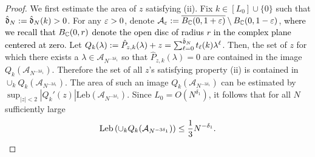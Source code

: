 \documentclass{amsart}
\numberwithin{equation}{section}
\def\corEE{\textcolor{amethyst}}
\def\corEE{}
\def\corABrev{\textcolor{black}}
\begin{document}
\begin{proof}
\corEE{We first estimate the area of $z$ satisfying (ii).}
Fix $k \in [L_0]\cup\{0\}$ such that $\hat {\mathfrak{d}}_N:=\hat{\mathfrak{d}}_N(k) >0$. For any $\varepsilon>0$, denote $\mathcal{A}_\varepsilon:= \overline{B_{\mathbb{C}}(0,1+\varepsilon)}\setminus B_{\mathbb{C}}(0,1-\varepsilon)$, \corABrev{where we recall that $B_{\mathbb{C}}(0,r)$ denote the open disc of radius $r$ in the complex plane centered at zero}. Let
\corEE{$Q_k(\lambda):= \hat{P}_{z,k}(\lambda) + z = \sum_{\ell=0}^{\hat{\mathfrak{d}}_N} t_\ell(k)\lambda^\ell$.  Then, the set of $z$ for which there exists a $\lambda \in \mathcal{A}_{N^{-3 \delta_1}}$ so that $\hat{P}_{z,k}(\lambda) = 0$ are contained in the image $Q_k(\mathcal{A}_{N^{-3 \delta_1}}).$}
Therefore the set of all $z$'s satisfying property (ii) is contained in $\cup_k Q_k(\mathcal{A}_{N^{-3 \delta_1}})$.
\corEE{The area of such an image $Q_k(\mathcal{A}_{N^{-3 \delta_1}})$ can be estimated by
$\sup_{|z| < 2} |Q_k'(z)|\mathrm{Leb} \left(\mathcal{A}_{N^{-3\delta_1}}\right).$
Since $L_0=O(N^{\delta_1})$, it follows that for all $N$ sufficiently large}
\[
\mathrm{Leb} \left(\cup_k Q_k(\mathcal{A}_{N^{-3\delta_1}})\right) \le \corABrev{\frac13} N^{-\delta_1}.
\]


\end{proof}
\end{document}
